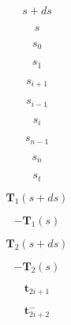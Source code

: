 \documentclass[a4paper,11pt,fleqn]{book}
\newcommand{\vect}[1]{\boldsymbol{#1}}
\begin{document}
\begin{equation}
s + ds
\end{equation}


\begin{equation}
s
\end{equation}


\begin{equation}
s_{0}
\end{equation}


\begin{equation}
s_{1}
\end{equation}


\begin{equation}
s_{i+1}
\end{equation}


\begin{equation}
s_{i-1}
\end{equation}


\begin{equation}
s_{i}
\end{equation}


\begin{equation}
s_{n-1}
\end{equation}


\begin{equation}
s_{n}
\end{equation}


\begin{equation}
s_t
\end{equation}


\begin{equation}
\vect{T}_{1}(s+ds)
\end{equation}


\begin{equation}
-\vect{T}_{1}(s)
\end{equation}


\begin{equation}
\vect{T}_{2}(s+ds)
\end{equation}


\begin{equation}
-\vect{T}_{2}(s)
\end{equation}


\begin{equation}
\vect{t}_{2i+1}
\end{equation}


\begin{equation}
\vect{t}_{2i+2}^-
\end{equation}
\end{document}
